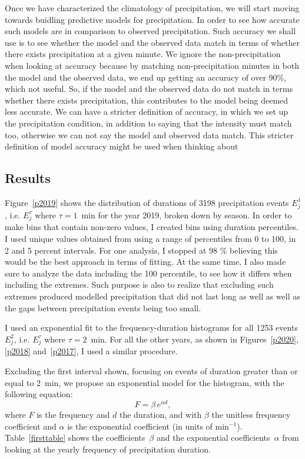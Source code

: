 \documentclass[11pt]{report}
\begin{document}
Once we have characterized the climatology of precipitation, we will start
moving towards buidling predictive models for precipitation. In order to see
how accurate such models are in comparison to observed precipitation. Such
accuracy we shall use is to see whether the model and the observed data
match in terms of whether there exists precipitation at a given minute. We
ignore the non-precipitation when looking at accuracy because by matching
non-precipitation minutes in both the model and the observed data, we end up
getting an accuracy of over 90\%, which not useful. So, if the model and the
observed data do not match in terms whether there exists precipitation, this
contributes to the model being deemed less accurate. We can have a stricter
definition of accuracy, in which we set up the precipitation condition, in
addition to saying that the intensity must match too, otherwise we can not
say the model and observed data match. This stricter definition of model
accuracy might be used when thinking about

\subsection{Results}\label{sec:apcr}

Figure~\ref{p2019} shows the distribution of durations of 3198 precipitation
events $E_j^1$, i.e. $E_j^\tau$ where $\tau=1$~min for the year 2019, broken
down by season. In order to make bins that contain non-zero values, I
created bins using duration percentiles. I used unique values obtained from
using a range of percentiles from 0 to 100, in 2 and 5 percent
intervals. For one analysis, I stopped at 98 \% believing this would be the
best approach in terms of fitting. At the same time, I also made sure to
analyze the data including the 100 percentile, to see how it differs when
including the extremes. Such purpose is also to realize that excluding such
extremes produced modelled precipitation that did not last long as well as
well as the gaps between precipitation events being too small.

I used an exponential fit to the frequency-duration histograms for all 1253
events $E_j^2$, i.e. $E_j^\tau$ where $\tau=2$~min. For all the other years,
as shown in Figures~\ref{p2020}, \ref{p2018} and~\ref{p2017}, I used a
similar procedure.

Excluding the first interval shown, focusing on events of duration
greater than or equal to 2~min, we propose an exponential model for
the histogram, with the following equation:
\begin{equation}\label{expod}
  F = \beta \,e^{\alpha d},
\end{equation}
where $F$ is the frequency and $d$ the duration, and with $\beta$ the
unitless frequency coefficient and $\alpha$ is the exponential coefficient
(in units of min$^{-1}$). Table~\ref{firsttable} shows the
coefficients~$\beta$ and the exponential coefficients~$\alpha$ from looking
at the yearly frequency of precipitation duration.
\end{document}
